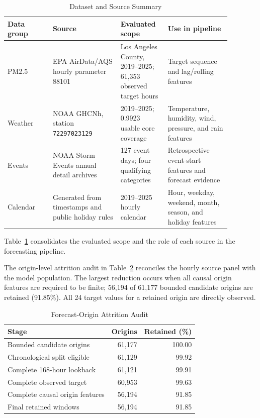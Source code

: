 \documentclass{ieeeaccess}
\begin{document}
\begin{table}[!t]
\centering
\caption{Dataset and Source Summary}
\label{tab:dataset_summary}
\begin{tabular}{p{0.18\linewidth}p{0.27\linewidth}p{0.18\linewidth}p{0.25\linewidth}}
\toprule
Data group & Source & Evaluated scope & Use in pipeline \\
\midrule
PM2.5 & EPA AirData/AQS hourly parameter 88101 & Los Angeles County,
2019--2025; 61,353 observed target hours & Target sequence and lag/rolling
features \\
Weather & NOAA GHCNh, station \texttt{72297023129} & 2019--2025;
0.9923 usable core coverage & Temperature, humidity, wind, pressure, and rain
features \\
Events & NOAA Storm Events annual detail archives & 127 event days; four
qualifying categories & Retrospective event-start features and forecast evidence \\
Calendar & Generated from timestamps and public holiday rules & 2019--2025
hourly calendar & Hour, weekday, weekend, month, season, and holiday features \\
\bottomrule
\end{tabular}
\end{table}

Table~\ref{tab:dataset_summary} consolidates the evaluated scope and the role
of each source in the forecasting pipeline.

The origin-level attrition audit in Table~\ref{tab:window_attrition} reconciles
the hourly source panel with the model population. The largest reduction occurs
when all causal origin features are required to be finite; 56,194 of 61,177
bounded candidate origins are retained (91.85\%). All 24 target values for a
retained origin are directly observed.

\begin{table}[!t]
\centering
\caption{Forecast-Origin Attrition Audit}
\label{tab:window_attrition}
\begin{tabular}{lrr}
\toprule
Stage & Origins & Retained (\%) \\
\midrule
Bounded candidate origins & 61,177 & 100.00 \\
Chronological split eligible & 61,129 & 99.92 \\
Complete 168-hour lookback & 61,121 & 99.91 \\
Complete observed target & 60,953 & 99.63 \\
Complete causal origin features & 56,194 & 91.85 \\
Final retained windows & 56,194 & 91.85 \\
\bottomrule
\end{tabular}
\end{table}
\end{document}
